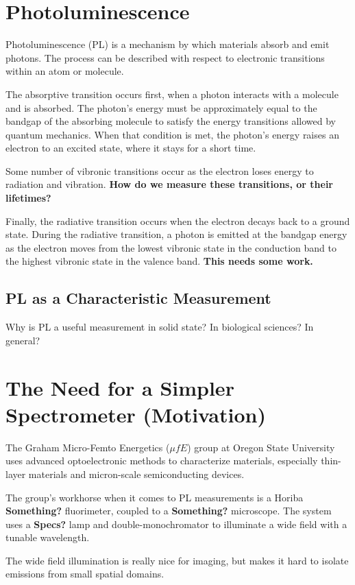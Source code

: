 \section{Photoluminescence}
Photoluminescence (PL) is a mechanism by which materials absorb and emit photons. The process can be described with respect to electronic transitions within an atom or molecule.

The absorptive transition occurs first, when a photon interacts with a molecule and is absorbed. The photon's energy must be approximately equal to the bandgap of the absorbing molecule to satisfy the energy transitions allowed by quantum mechanics. When that condition is met, the photon's energy raises an electron to an excited state, where it stays for a short time.

Some number of vibronic transitions occur as the electron loses energy to radiation and vibration. \textbf{How do we measure these transitions, or their lifetimes?}

Finally, the radiative transition occurs when the electron decays back to a ground state. During the radiative transition, a photon is emitted at the bandgap energy as the electron moves from the lowest vibronic state in the conduction band to the highest vibronic state in the valence band. \textbf{This needs some work.}

\subsection{PL as a Characteristic Measurement}
Why is PL a useful measurement in solid state? In biological sciences? In general?


\section{The Need for a Simpler Spectrometer (Motivation)}
The Graham Micro-Femto Energetics ($\mu fE$) group at Oregon State University uses advanced optoelectronic methods to characterize materials, especially thin-layer materials and micron-scale semiconducting devices.

The group's workhorse when it comes to PL measurements is a Horiba \textbf{Something?} fluorimeter, coupled to a \textbf{Something?} microscope. The system uses a \textbf{Specs?} lamp and double-monochromator to illuminate a wide field with a tunable wavelength.

The wide field illumination is really nice for imaging, but makes it hard to isolate emissions from small spatial domains.

